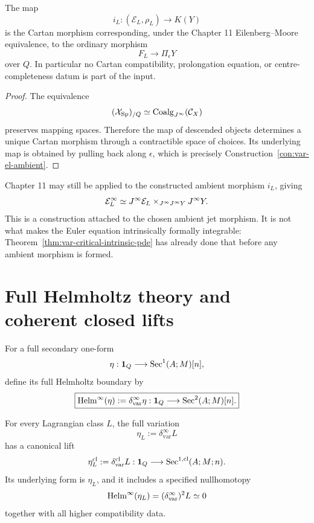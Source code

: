\begin{proposition}
\label{prop:var-el-ambient-cartan}
The map
\[
    i_L:(\mathcal E_L,\rho_L)\longrightarrow K(Y)
\]
is the Cartan morphism corresponding, under the Chapter 11 Eilenberg--Moore equivalence, to the ordinary morphism
\[
    F_L\longrightarrow\Pi_\epsilon Y
\]
over \(Q\). In particular no Cartan compatibility, prolongation equation, or centre-completeness datum is part of the input.
\end{proposition}

\begin{proof}
The equivalence
\[
    (\mathcal{X}_{\mathrm{Sp}})_{/Q}
    \simeq
    \operatorname{Coalg}_{J^{\infty}}(\mathcal C_X)
\]
preserves mapping spaces. Therefore the map of descended objects determines a unique Cartan morphism through a contractible space of choices. Its underlying map is obtained by pulling back along \(\epsilon\), which is precisely Construction~\ref{con:var-el-ambient}.
\end{proof}

\begin{remark}
\label{rem:var-el-prolongation}
Chapter 11 may still be applied to the constructed ambient morphism \(i_L\), giving
\[
    \mathcal E_L^{\infty}
    \simeq
    J^{\infty}\mathcal E_L
    \times_{J^{\infty}J^{\infty} Y}
    J^{\infty} Y.
\]
This is a construction attached to the chosen ambient jet morphism. It is not what makes the Euler equation intrinsically formally integrable: Theorem~\ref{thm:var-critical-intrinsic-pde} has already done that before any ambient morphism is formed.
\end{remark}

\section{Full Helmholtz theory and coherent closed lifts}
\label{sec:var-helmholtz}

\begin{definition}
\label{def:var-helmholtz}
For a full secondary one-form
\[
    \eta:\mathbf 1_Q\longrightarrow\operatorname{Sec}^1(A;M)[n],
\]
define its full Helmholtz boundary by
\[
    \boxed{
    \operatorname{Helm}^{\infty}(\eta)
    :=
    \delta^{\infty}_{\mathrm{var}}\eta:
    \mathbf 1_Q\longrightarrow\operatorname{Sec}^2(A;M)[n].
    }
\]
\end{definition}

\begin{proposition}
\label{prop:var-helmholtz-euler}
For every Lagrangian class \(L\), the full variation
\[
    \eta_L:=\delta^{\infty}_{\mathrm{var}}L
\]
has a canonical lift
\[
    \eta_L^{\mathrm{cl}}
    :=
    \delta^{\mathrm{cl}}_{\mathrm{var}}L
    :
    \mathbf 1_Q\longrightarrow
    \operatorname{Sec}^{1,\mathrm{cl}}(A;M;n).
\]
Its underlying form is \(\eta_L\), and it includes a specified nullhomotopy
\[
    \operatorname{Helm}^{\infty}(\eta_L)
    =
    (\delta^{\infty}_{\mathrm{var}})^2L
    \simeq0
\]
together with all higher compatibility data.
\end{proposition}


